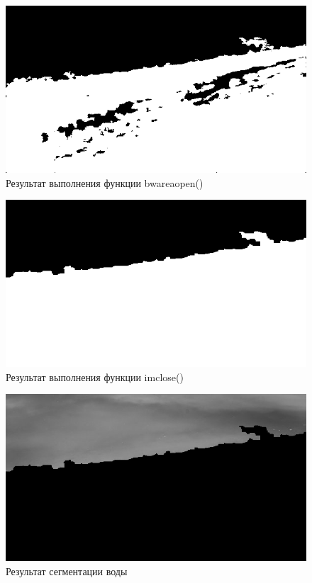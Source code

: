 \begin{figure}[H]
\centering 
\includegraphics[width=\textwidth]{../outputs/image_bwareoopen_segmentation.png}
\caption{Результат выполнения функции bwareaopen()}
\label{fig:р}
\end{figure}

\pagebreak

\begin{figure}[H]
    \includegraphics[width=\textwidth]{../outputs/image_imclose_segmentation.png}
    \caption{Результат выполнения функции imclose()}
    \label{fig:р}
\end{figure}

\begin{figure}[H]
    \includegraphics[width=\textwidth]{../outputs/I.png}
    \caption{Результат сегментации воды}
    \label{fig:р}
\end{figure}

